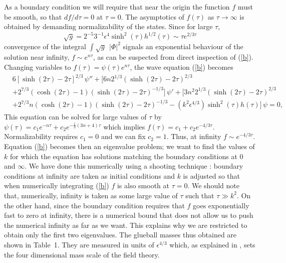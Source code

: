 \documentclass[12pt,epsf,a4paper]{article}
\begin{document}
As a boundary condition we will 
require that near the origin the function $f$ must be smooth, so that $df/d \tau =0$ at 
$\tau = 0$. The asymptotics of $f(\tau)$ as $\tau \rightarrow \infty$ is obtained by 
demanding normalizability of the states. Since for large $\tau$,
\begin{equation}
\sqrt{g} = 2^{-5} 3^{-1} 
\epsilon^4 \sinh^2(\tau) h^{1/2}(\tau) \sim \tau e^{2/3 \tau}
\end{equation}
convergence of the integral 
$\int \! \sqrt{g} \: \: |\Phi|^2$ signals an exponential behaviour of the solution 
near infinity, $f \sim e^{n \tau}$, as can be suspected from direct inspection 
of (\ref{b}). Changing  variables to $f(\tau) = \psi(\tau) e^{n \tau}$, the wave 
equation (\ref{b}) becomes
\begin{equation}
\begin{split}
&6[\sinh(2 \tau) -2 \tau]^{2/3} \, \psi'' + [6n 2^{1/3} (\sinh (2 \tau) - 2 \tau)^{2/3} \\
&+ 2^{7/3} (\cosh ( 2 \tau)-1)(\sinh(2 \tau) - 2 \tau)^{-1/3}] \, \psi' 
+ [3 n^2 2^{1/3} (\sinh (2 \tau)-2 \tau)^{2/3} \\
&+ 2^{7/3} n (\cosh(2 \tau) -1)
(\sinh (2 \tau) -2 \tau)^{-1/3} - (k^2 \epsilon^{4/3}) \sinh^2(\tau) h(\tau)] \, \psi = 0,
\label{c}
\end{split}
\end{equation}
This equation  can be solved for large values of $\tau$ by $\psi(\tau) = c_1 e^{-n \tau} + 
c_2 e^{- \frac {1}{3} (3n +4) \tau}$ which implies  
$f(\tau) = c_1 + c_2 e^{-4/3 \tau}$. Normalizability requires $c_1=0 $ and we 
can fix $c_2=1$. Thus, at infinity $f \sim e^{-4/3 \tau}$. 
Equation (\ref{b}) becomes then an eigenvalue problem; we want to find the values of $k$ 
for which the equation has solutions matching the 
boundary conditions at $0$ and $\infty$. We have done this numerically using 
a shooting technique \cite{gb1}: boundary conditions at infinity are taken 
as initial conditions and $k$ is adjusted  so that when numerically integrating 
(\ref{b}) $f$ is also smooth at $\tau=0$. 
We should note that, numerically, infinity is taken as some large value of 
$\tau$ such that $\tau \gg k^2$. On the other hand, since the boundary 
condition 
requires that $f$ goes exponentially fast to zero at infinity, there is a 
numerical bound that does not allow us to push the numerical infinity as far 
as we want. This explains why we are restricted to obtain only the 
first two eigenvalues. 
The glueball masses 
thus obtained are shown in Table~1. They are measured in units of $\epsilon^{4/3}$ which, 
as explained in \cite{KS}, sets the four dimensional mass scale of the field theory.
\end{document}
